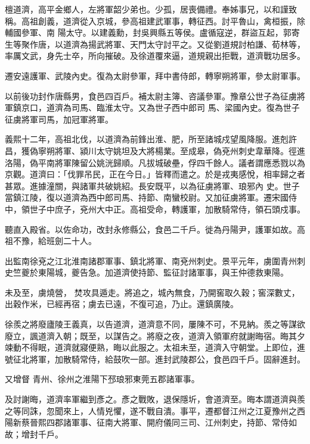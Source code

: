 \begin{pinyinscope}
 檀道濟，高平金鄉人，左將軍韶少弟也。少孤，居喪備禮。奉姊事兄，以和謹致稱。高祖創義，道濟從入京城，參高祖建武軍事，轉征西。討平魯山，禽桓振，除輔國參軍、南
 陽太守。以建義勳，封吳興縣五等侯。盧循寇逆，群盜互起，郭寄生等聚作唐，以道濟為揚武將軍、天門太守討平之。又從劉道規討柏謙、荀林等，率厲文武，身先士卒，所向摧破。及徐道覆來逼，道規親出拒戰，道濟戰功居多。



 遷安遠護軍、武陵內史。復為太尉參軍，拜中書侍郎，轉寧朔將軍，參太尉軍事。



 以前後功封作唐縣男，食邑四百戶。補太尉主簿、咨議參軍。豫章公世子為征虜將軍鎮京口，道濟為司馬、臨淮太守。又為世子西中郎司
 馬、梁國內史。復為世子征虜將軍司馬，加冠軍將軍。



 義熙十二年，高祖北伐，以道濟為前鋒出淮、肥，所至諸城戍望風降服。進剋許昌，獲偽寧朔將軍、潁川太守姚坦及大將楊業。至成皋，偽兗州刺史韋華降。徑進洛陽，偽平南將軍陳留公姚洸歸順。凡拔城破壘，俘四千餘人。議者謂應悉戮以為京觀。道濟曰：「伐罪吊民，正在今日。」皆釋而遣之。於是戎夷感悅，相率歸之者甚眾。進據潼關，與諸軍共破姚紹。長安既平，以為征虜將軍、琅邪內
 史。世子當鎮江陵，復以道濟為西中郎司馬、持節、南蠻校尉。又加征虜將軍。遷宋國侍中，領世子中庶子，兗州大中正。高祖受命，轉護軍，加散騎常侍，領石頭戍事。



 聽直入殿省。以佐命功，改封永修縣公，食邑二千戶。徙為丹陽尹，護軍如故。高祖不豫，給班劍二十人。



 出監南徐兗之江北淮南諸郡軍事、鎮北將軍、南兗州刺史。景平元年，虜圍青州刺史竺夔於東陽城，夔告急。加道濟使持節、監征討諸軍事，與王仲德救東陽。



 未及至，虜燒營，
 焚攻具遁走。將追之，城內無食，乃開窖取久穀；窖深數丈，出穀作米，已經再宿；虜去已遠，不復可追，乃止。還鎮廣陵。



 徐羨之將廢廬陵王義真，以告道濟，道濟意不同，屢陳不可，不見納。羨之等謀欲廢立，諷道濟入朝；既至，以謀告之。將廢之夜，道濟入領軍府就謝晦宿。晦其夕竦動不得眠，道濟就寢便熟，晦以此服之。太祖未至，道濟入守朝堂。上即位，進號征北將軍，加散騎常侍，給鼓吹一部。進封武陵郡公，食邑四千戶。固辭進封。



 又增督
 青州、徐州之淮陽下邳琅邪東莞五郡諸軍事。



 及討謝晦，道濟率軍繼到彥之。彥之戰敗，退保隱圻，會道濟至。晦本謂道濟與羨之等同誅，忽聞來上，人情兇懼，遂不戰自潰。事平，遷都督江州之江夏豫州之西陽新蔡晉熙四郡諸軍事、征南大將軍、開府儀同三司、江州刺史，持節、常侍如故；增封千戶。




\end{pinyinscope}
